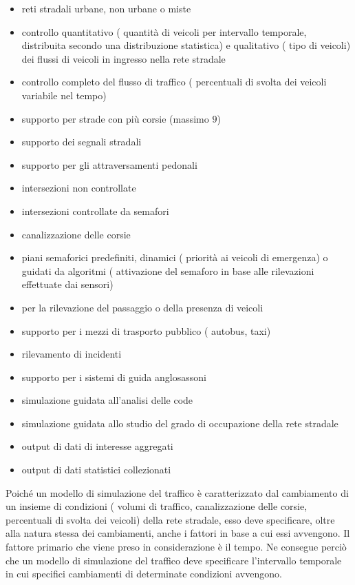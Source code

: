 \begin{itemize}
    \item reti stradali urbane, non urbane o miste
    \item controllo quantitativo (\ie{} quantità di veicoli per intervallo temporale, distribuita secondo una distribuzione statistica) e qualitativo (\ie{} tipo di veicoli) dei flussi di veicoli in ingresso nella rete stradale
    \item controllo completo del flusso di traffico (\ie{} percentuali di svolta dei veicoli variabile nel tempo)
    \item supporto per strade con più corsie (massimo $9$)
    \item supporto dei segnali stradali
    \item supporto per gli attraversamenti pedonali
    \item intersezioni non controllate
    \item intersezioni controllate da semafori
    \item canalizzazione delle corsie
    \item piani semaforici predefiniti, dinamici (\eg{} priorità ai veicoli di emergenza) o guidati da algoritmi (\eg{} attivazione del semaforo in base alle rilevazioni effettuate dai sensori)
    \item {} per la rilevazione del passaggio o della presenza di veicoli
    \item supporto per i mezzi di trasporto pubblico (\ie{} autobus, taxi)
    \item rilevamento di incidenti
    \item supporto per i sistemi di guida anglosassoni
    \item simulazione guidata all'analisi delle code
    \item simulazione guidata allo studio del grado di occupazione della rete stradale
    \item output di dati di interesse aggregati
    \item output di dati statistici collezionati
\end{itemize}

Poiché un modello di simulazione del traffico è caratterizzato dal cambiamento di un insieme di condizioni (\eg{} volumi di traffico, canalizzazione delle corsie, percentuali di svolta dei veicoli) della rete stradale, esso deve specificare, oltre alla natura stessa dei cambiamenti, anche i fattori in base a cui essi avvengono. Il fattore primario che viene preso in considerazione è il tempo. Ne consegue perciò che un modello di simulazione del traffico deve specificare l'intervallo temporale in cui specifici cambiamenti di determinate condizioni avvengono.

